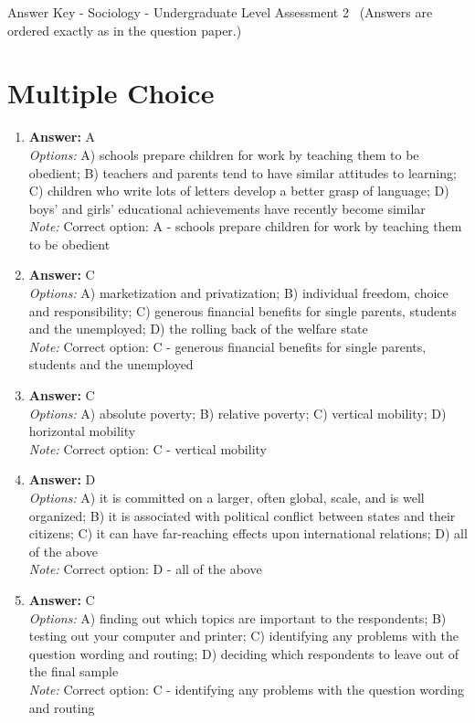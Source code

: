 \documentclass[12pt]{article}
\begin{document}
\begin{center}
Answer Key - Sociology - Undergraduate Level Assessment 2 \
\small (Answers are ordered exactly as in the question paper.)
\end{center}

\section*{Multiple Choice}
\begin{enumerate}[label=\arabic*.]
\item \textbf{Answer:} A
\\ \textit{Options:} A) schools prepare children for work by teaching them to be obedient; B) teachers and parents tend to have similar attitudes to learning; C) children who write lots of letters develop a better grasp of language; D) boys' and girls' educational achievements have recently become similar
\\ \textit{Note:} Correct option: A - schools prepare children for work by teaching them to be obedient
\item \textbf{Answer:} C
\\ \textit{Options:} A) marketization and privatization; B) individual freedom, choice and responsibility; C) generous financial benefits for single parents, students and the unemployed; D) the rolling back of the welfare state
\\ \textit{Note:} Correct option: C - generous financial benefits for single parents, students and the unemployed
\item \textbf{Answer:} C
\\ \textit{Options:} A) absolute poverty; B) relative poverty; C) vertical mobility; D) horizontal mobility
\\ \textit{Note:} Correct option: C - vertical mobility
\item \textbf{Answer:} D
\\ \textit{Options:} A) it is committed on a larger, often global, scale, and is well organized; B) it is associated with political conflict between states and their citizens; C) it can have far-reaching effects upon international relations; D) all of the above
\\ \textit{Note:} Correct option: D - all of the above
\item \textbf{Answer:} C
\\ \textit{Options:} A) finding out which topics are important to the respondents; B) testing out your computer and printer; C) identifying any problems with the question wording and routing; D) deciding which respondents to leave out of the final sample
\\ \textit{Note:} Correct option: C - identifying any problems with the question wording and routing
\end{enumerate}
\end{document}
